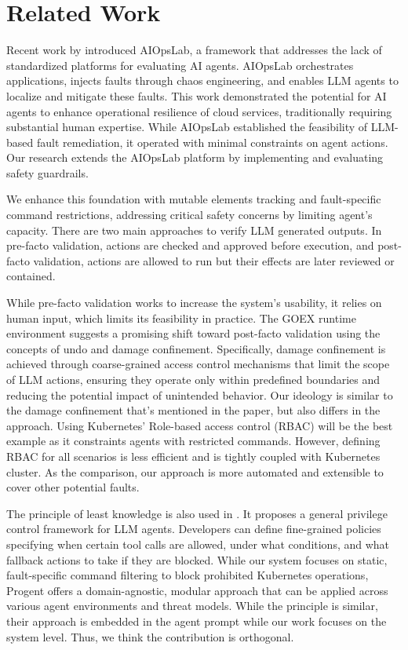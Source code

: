 \section{Related Work}
\label{sec:related_work}

Recent work by \cite{shetty2024aiagents} introduced AIOpsLab, a framework that addresses the lack of standardized platforms for evaluating AI agents. AIOpsLab orchestrates applications, injects faults through chaos engineering, and enables LLM agents to localize and mitigate these faults. This work demonstrated the potential for AI agents to enhance operational resilience of cloud services, traditionally requiring substantial human expertise. 
While AIOpsLab established the feasibility of LLM-based fault remediation, it operated with minimal constraints on agent actions. Our research extends the AIOpsLab platform by implementing and evaluating safety guardrails. 

We enhance this foundation with mutable elements tracking and fault-specific command restrictions, addressing critical safety concerns by limiting agent’s capacity. There are two main approaches to verify LLM generated outputs. In pre-facto validation, actions are checked and approved before execution, and post-facto validation, actions are allowed to run but their effects are later reviewed or contained.

While pre-facto validation works to increase the system’s usability, it relies on human input, which limits its feasibility in practice. The GOEX runtime environment \cite{patil2024goexperspectivesdesignsruntime} suggests a promising shift toward post-facto validation using the concepts of undo and damage confinement. Specifically, damage confinement is achieved through coarse-grained access control mechanisms that limit the scope of LLM actions, ensuring they operate only within predefined boundaries and reducing the potential impact of unintended behavior. Our ideology is similar to the damage confinement that's mentioned in the paper, but also differs in the approach. Using Kubernetes' Role-based access control (RBAC) will be the best example as it constraints agents with restricted commands. However, defining RBAC for all scenarios is less efficient and is tightly coupled with Kubernetes cluster. As the comparison, our approach is more automated and extensible to cover other potential faults.

The principle of least knowledge is also used in \cite{shi2025progent}. It proposes a general privilege control framework for LLM agents. Developers can define fine-grained policies specifying when certain tool calls are allowed, under what conditions, and what fallback actions to take if they are blocked. While our system focuses on static, fault-specific command filtering to block prohibited Kubernetes operations, Progent offers a domain-agnostic, modular approach that can be applied across various agent environments and threat models. While the principle is similar, their approach is embedded in the agent prompt while our work focuses on the system level. Thus, we think the contribution is orthogonal.
